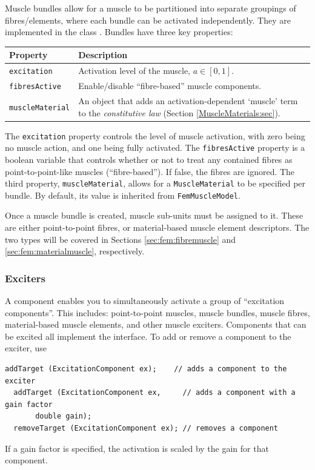 Muscle bundles allow for a muscle to be partitioned into separate groupings
of fibres/elements, where each bundle can be activated independently.  They 
are implemented in the class .
Bundles have three key properties:
\begin{center}
	\begin{tabular}{|ll|}
		\hline
		Property & Description\\
		\hline
		{\tt excitation} & Activation level of the muscle,  $a\in[0, 1]$.\\
		{\tt fibresActive} & Enable/disable ``fibre-based'' muscle components.\\
		{\tt muscleMaterial} & An object that adds an activation-dependent
		                       `muscle' term to the \emph{constitutive law} (Section \ref{MuscleMaterials:sec}).\\
		\hline
	\end{tabular}
\end{center}
The {\tt excitation} property controls the level of muscle activation, with zero 
being no muscle action, and one being fully activated.  The {\tt fibresActive} 
property is a boolean variable that controls whether or not to treat any 
contained fibres as point-to-point-like muscles (``fibre-based'').  If false, 
the fibres are ignored.  The third property, {\tt muscleMaterial}, allows for a 
{\tt MuscleMaterial} to be specified per bundle.  By default, its value is 
inherited from {\tt FemMuscleModel}.

Once a muscle bundle is created, muscle sub-units must be assigned to it.  These
are either point-to-point fibres, or material-based muscle element descriptors.
The two types will be covered in Sections \ref{sec:fem:fibremuscle} and
\ref{sec:fem:materialmuscle}, respectively.

\subsubsection{Exciters}
\label{MuscleExciters:sec}
\ifLaTeXML{\newline}

A  component enables you to simultaneously
activate a group of ``excitation components''.  This includes: point-to-point
muscles, muscle bundles, muscle fibres, material-based muscle elements, and
other muscle exciters.  Components that can be excited all implement the
interface.  To add or remove a component to the exciter, use
\begin{lstlisting}[]
  addTarget (ExcitationComponent ex);    // adds a component to the exciter
  addTarget (ExcitationComponent ex,     // adds a component with a gain factor
  	   double gain);   
  removeTarget (ExcitationComponent ex); // removes a component
\end{lstlisting}
If a gain factor is specified, the activation is scaled by the gain for that
component.

